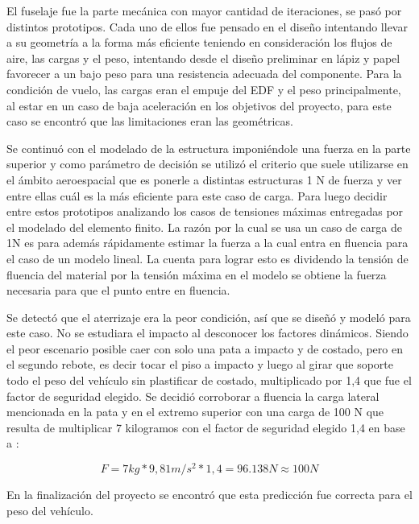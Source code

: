 \medskip

El fuselaje fue la parte mecánica con mayor cantidad de iteraciones, se pasó por distintos prototipos. Cada uno de ellos fue pensado en el diseño intentando llevar a su geometría a la forma más eficiente teniendo en consideración los flujos de aire, las cargas y el peso, intentando desde el diseño preliminar en lápiz y papel favorecer a un bajo peso para una resistencia adecuada del componente. Para la condición de vuelo, las cargas eran el empuje del EDF y el peso principalmente, al estar en un caso de baja aceleración en los objetivos del proyecto, para este caso se encontró que las limitaciones eran las geométricas. 

Se continuó con el modelado de la estructura imponiéndole una fuerza en la parte superior y como parámetro de decisión se utilizó el criterio que suele utilizarse en el ámbito aeroespacial que es ponerle a distintas estructuras 1 N de fuerza y ver entre ellas cuál es la más eficiente para este caso de carga. Para luego decidir entre estos prototipos analizando los casos de tensiones máximas entregadas por el modelado del elemento finito. La razón por la cual se usa un caso de carga de 1N es para además rápidamente estimar la fuerza a la cual entra en fluencia para el caso de un modelo lineal. La cuenta para lograr esto es dividendo la tensión de fluencia del material por la tensión máxima en el modelo se obtiene la fuerza necesaria para que el punto entre en fluencia.

Se detectó que el aterrizaje era la peor condición, así que se diseñó y modeló para este caso. No se estudiara el impacto al desconocer los factores dinámicos. Siendo el peor escenario posible caer con solo una pata a impacto y de costado, pero en el segundo rebote, es decir tocar el piso a impacto y luego al girar que soporte todo el peso del vehículo sin plastificar de costado, multiplicado por 1,4 que fue el factor de seguridad elegido.  Se decidió corroborar a fluencia la carga lateral mencionada en la pata y en el extremo superior con una carga de 100 N que resulta de multiplicar 7 kilogramos con el factor de seguridad elegido 1,4 en base a \cite{zipay2016ultimate}:

\begin{equation}
    F = 7 kg * 9,81 m/s^2 * 1,4 = 96.138 N \approx 100 N
\end{equation}

En la finalización del proyecto se encontró que esta predicción fue correcta para el peso del vehículo.


